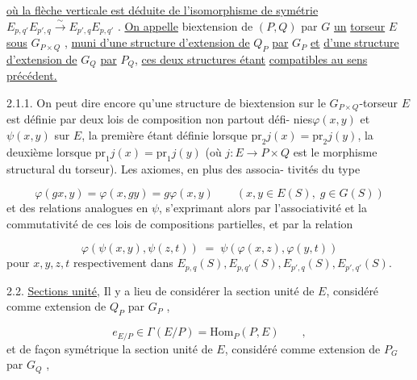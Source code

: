 \underline{où la flèche verticale est déduite de l'isomorphisme de symétrie}
$E_{p,q'}E_{p',q} \overset{\sim}{\longrightarrow} E_{p',q}E_{p,q'}$ . \underline{On appelle} biextension de $(P,Q)$ par $G$ \underline{un}
\underline{torseur} $E$ \underline{sous} $G_{P\times Q}$ , \underline{muni d'une structure d'extension de} $Q_P$ \underline{par} $G_P$ \underline{et}
\underline{d'une structure d'extension de} $G_Q$ \underline{par} $P_Q$, \underline{ces deux structures étant}
\underline{compatibles au sens précédent.}



2.1.1.  On peut dire encore qu'une structure de biextension sur le
$G_{P\times Q}$-torseur $E$ est définie par deux lois de composition non partout défi-
nies$\varphi(x,y)$ et $\psi(x,y)$ sur $E$, la première étant définie lorsque
$\mathrm{pr}_2 j(x) = \mathrm{pr}_2 j(y)$, la deuxième lorsque $\mathrm{pr}_1 j(x) = \mathrm{pr}_1 j(y)$ (où $j : E \to P\times Q$
est le morphisme structural du torseur). Les axiomes, en plus des associa-
tivités du type

\begin{equation}\tag{2.1.1.1}
\varphi(gx,y) = \varphi(x,gy) = g\varphi(x,y) \qquad (x,y \in E(S), \; g \in G(S))
\end{equation}
et des relations analogues en $\psi$, s'exprimant alors par l'associativité
et la commutativité de ces lois de compositions partielles, et par la
relation

\begin{equation}\tag{2.1.1.2}
\varphi(\psi(x,y),\psi(z,t)) \;=\; \psi(\varphi(x,z),\varphi(y,t))
\end{equation}
pour $x,y,z,t$ respectivement dans $E_{p,q}(S),E_{p,q'}(S),E_{p',q}(S),E_{p',q'}(S)$.

2.2.  \underline{Sections unité}, Il y a lieu de considérer la section unité de $E$,
considéré comme extension de $Q_P$ par $G_P$ ,

\begin{equation}\tag{2.2.1}
e_{E/P} \in \Gamma(E/P) = \mathrm{Hom}_P(P,E) \qquad ,
\end{equation}
et de façon symétrique la section unité de $E$, considéré comme extension
de $P_G$ par $G_Q$ ,

